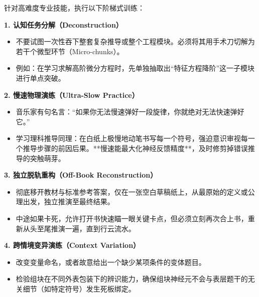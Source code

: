 \documentclass[12pt,a4paper,openany]{ctexbook}
\begin{document}
\begin{practicebox}[复杂学科深度组块化训练协议]
针对高难度专业技能，执行以下阶梯式训练：

\textbf{1. 认知任务分解（Deconstruction）}
\begin{itemize}
    \item 不要试图一次性吞下整套复杂推导或整个工程模块。必须将其用手术刀切解为若干个微型环节（Micro-chunks）。
    \item 例如：在学习求解高阶微分方程时，先单独抽取出“特征方程降阶”这一子模块进行单点突破。
\end{itemize}

\textbf{2. 慢速物理演练（Ultra-Slow Practice）}
\begin{itemize}
    \item 音乐家有句名言：“如果你无法慢速弹好一段旋律，你就绝对无法快速弹好它。”
    \item 学习理科推导同理：在白纸上极慢地动笔书写每一个符号，强迫意识审视每一个推导步骤的前因后果。**慢速能最大化神经反馈精度**，及时修剪掉错误推导的突触萌芽。
\end{itemize}

\textbf{3. 独立脱轨重构（Off-Book Reconstruction）}
\begin{itemize}
    \item 彻底移开教材与标准参考答案，仅在一张空白草稿纸上，从最原始的定义或公理出发，独立推演至最终结果。
    \item 中途如果卡死，允许打开书快速瞄一眼关键卡点，但必须立刻再次合上书，重新从头至尾推演一遍，直到行云流水。
\end{itemize}

\textbf{4. 跨情境变异演练（Context Variation）}
\begin{itemize}
    \item 改变变量命名，或者故意给出一个缺少某项条件的变体题目。
    \item 检验组块在不同外表包装下的辨识能力，确保组块神经元不会与表层题干的无关细节（如特定符号）发生死板绑定。
\end{itemize}
\end{practicebox}
\end{document}
